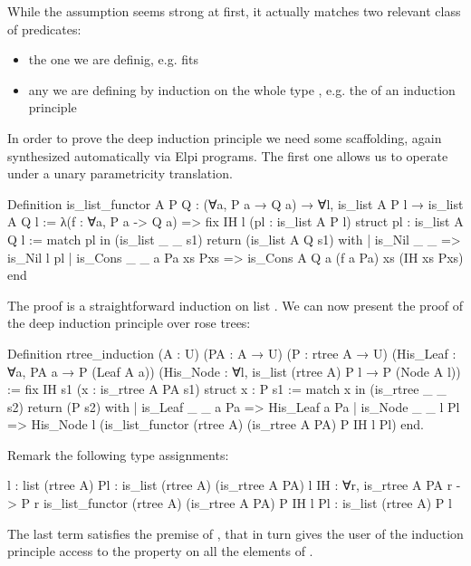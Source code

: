 \documentclass[a4paper, 11pt]{book}
\begin{document}
While the assumption seems strong at first, it actually matches two relevant class
of predicates:
\begin{itemize}
  \item the one we are definig, e.g.  fits
  \item any  we are defining by induction on the whole
    type , e.g. the  of an induction principle
\end{itemize}

In order to prove the deep induction principle we need some scaffolding,
again synthesized automatically via Elpi programs. The first one
allows us to operate under a unary parametricity translation.

\begin{rocqcode}
Definition is_list_functor A P Q :
  (∀a, P a → Q a) → ∀l, is_list A P l → is_list A Q l
:=
  λ(f : ∀a, P a -> Q a) =>
    fix IH l (pl : is_list A P l) {struct pl} : is_list A Q l :=
      match pl in (is_list _ _ s1) return (is_list A Q s1) with
      | is_Nil _ _ => is_Nil l pl
      | is_Cons _ _ a Pa xs Pxs =>
          is_Cons A Q a (f a Pa) xs (IH xs Pxs)
      end
\end{rocqcode}

The proof is a straightforward induction on list .
We can now present the proof of the deep induction principle over rose trees:

\begin{rocqcode}
Definition rtree_induction (A : U) (PA : A → U) (P : rtree A → U)
    (His_Leaf : ∀a, PA a → P (Leaf A a))
    (His_Node : ∀l, is_list (rtree A) P l → P (Node A l))
:=
  fix IH s1 (x : is_rtree A PA s1) {struct x} : P s1 :=
  match x in (is_rtree _ _ s2) return (P s2) with
  | is_Leaf _ _ a Pa =>
      His_Leaf a Pa
  | is_Node _ _ l Pl =>
      His_Node l (is_list_functor (rtree A) (is_rtree A PA) P IH l Pl)
  end.
\end{rocqcode}

Remark the following type assignments:

\begin{rocqcode}
l : list (rtree A)
Pl : is_list (rtree A) (is_rtree A PA) l
IH : ∀r, is_rtree A PA r -> P r
is_list_functor (rtree A) (is_rtree A PA) P IH l Pl :
  is_list (rtree A) P l
\end{rocqcode}

The last term satisfies the premise of , that in turn
gives the user of the induction principle access to the property 
on all the elements of .
\end{document}
